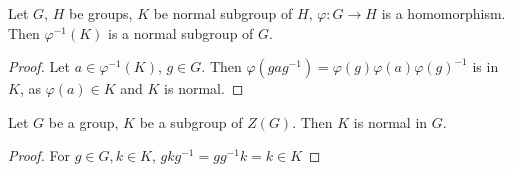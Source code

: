 \documentclass{article}
\begin{document}
\begin{appendix}
    \begin{lemma*}
        Let $G$, $H$ be groups, $K$ be normal subgroup of $H$, $\varphi : G \to H$ is a homomorphism. Then $\varphi^{-1}(K)$ is a normal subgroup of $G$.
    \end{lemma*}

    \begin{proof}
        Let $a \in \varphi^{-1}(K)$, $g \in G$. Then $\varphi(gag^{-1}) = \varphi(g)\varphi(a)\varphi(g)^{-1}$ is in $K$, as $\varphi(a) \in K$ and $K$ is normal.
    \end{proof}

    \begin{lemma*}
        Let $G$ be a group, $K$ be a subgroup of $Z(G)$. Then $K$ is normal in $G$.
    \end{lemma*}

    \begin{proof}
        For $g \in G, k \in K$, $gkg^{-1} = gg^{-1}k = k \in K$
    \end{proof}

    \end{appendix}
\end{document}
